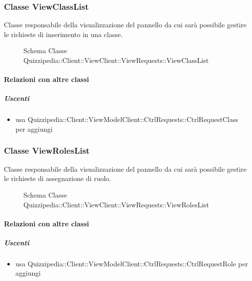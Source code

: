 \subsubsection{Classe ViewClassList}
Classe responsabile della visualizzazione del pannello da cui sarà possibile gestire le richieste di inserimento in una classe.
\begin{figure}[H]
\centering
\noindent{}
\caption[Schema Classe ViewClassList]{Schema Classe Quizzipedia::Client::ViewClient::ViewRequests::ViewClassList}
\end{figure}
\paragraph{Relazioni con altre classi}
\subparagraph{Uscenti}
\begin{itemize}
\item usa Quizzipedia::Client::ViewModelClient::CtrlRequests::CtrlRequestClass per aggiungi
\end{itemize}
\subsubsection{Classe ViewRolesList}
Classe responsabile della visualizzazione del pannello da cui sarà possibile gestire le richieste di assegnazione di ruolo.
\begin{figure}[H]
\centering
\noindent{}
\caption[Schema Classe ViewRolesList]{Schema Classe Quizzipedia::Client::ViewClient::ViewRequests::ViewRolesList}
\end{figure}
\paragraph{Relazioni con altre classi}
\subparagraph{Uscenti}
\begin{itemize}
\item usa Quizzipedia::Client::ViewModelClient::CtrlRequests::CtrlRequestRole per aggiungi
\end{itemize}

